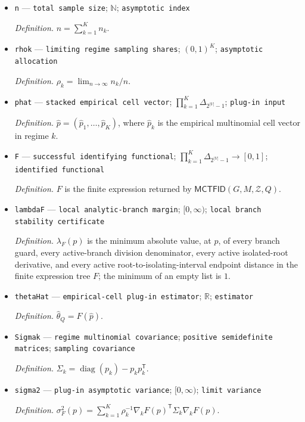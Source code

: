 \documentclass{article}
\begin{document}
\begin{itemize}
  \item \texttt{n} --- \texttt{total sample size}; \(\mathbb N\); \texttt{asymptotic index}
  \par\smallskip\noindent\emph{Definition.} \(n=\sum_{k=1}^{K}n_k\).
  \item \texttt{rhok} --- \texttt{limiting regime sampling shares}; \((0,1)^K\); \texttt{asymptotic allocation}
  \par\smallskip\noindent\emph{Definition.} \(\rho_k=\lim_{n\to\infty}n_k/n\).
  \item \texttt{phat} --- \texttt{stacked empirical cell vector}; \(\prod_{k=1}^{K}\Delta_{2^{|V|}-1}\); \texttt{plug-\allowbreak{}in input}
  \par\smallskip\noindent\emph{Definition.} \(\widehat p=(\widehat p_1,\ldots,\widehat p_K)\), where \(\widehat p_k\) is the empirical multinomial cell vector in regime \(k\).
  \item \texttt{F} --- \texttt{successful identifying functional}; \(\prod_{k=1}^{K}\Delta_{2^{|V|}-1}\to[0,1]\); \texttt{identified functional}
  \par\smallskip\noindent\emph{Definition.} \(F\) is the finite expression returned by \(\mathsf{MCTFID}(G,M,\mathcal Z,Q)\).
  \item \texttt{lambdaF} --- \texttt{local analytic-\allowbreak{}branch margin}; \([0,\infty)\); \texttt{local branch stability certificate}
  \par\smallskip\noindent\emph{Definition.} \(\lambda_F(p)\) is the minimum absolute value, at \(p\), of every branch guard, every active-branch division denominator, every active isolated-root derivative, and every active root-to-isolating-interval endpoint distance in the finite expression tree \(F\); the minimum of an empty list is \(1\).
  \item \texttt{thetaHat} --- \texttt{empirical-\allowbreak{}cell plug-\allowbreak{}in estimator}; \(\mathbb R\); \texttt{estimator}
  \par\smallskip\noindent\emph{Definition.} \(\widehat\theta_Q=F(\widehat p)\).
  \item \texttt{Sigmak} --- \texttt{regime multinomial covariance}; \texttt{positive semidefinite matrices}; \texttt{sampling covariance}
  \par\smallskip\noindent\emph{Definition.} \(\Sigma_k=\operatorname{diag}(p_k)-p_kp_k^{\mathsf T}\).
  \item \texttt{sigma2} --- \texttt{plug-\allowbreak{}in asymptotic variance}; \([0,\infty)\); \texttt{limit variance}
  \par\smallskip\noindent\emph{Definition.} \(\sigma_F^2(p)=\sum_{k=1}^{K}\rho_k^{-1}\nabla_kF(p)^{\mathsf T}\Sigma_k\nabla_kF(p)\).

\end{itemize}
\end{document}
